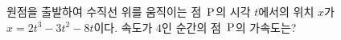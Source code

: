 원점을 출발하여 수직선 위를 움직이는 점~$\mathrm{P}$의 시각 $t$에서의 위치 $x$가 $x=2t^3-3t^2-8t$이다. 속도가 $4$인 순간의 점~$\mathrm{P}$의 가속도는?
